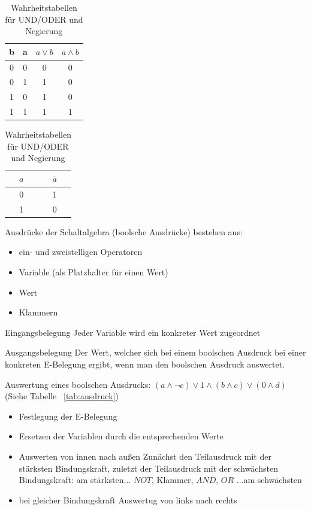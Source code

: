 \documentclass[10pt,a4paper]{scrartcl}
\newcommand{\reftbl}[1]{Tabelle ~\ref{#1}}
\begin{document}
\begin{table}[h]
	\centering
	\begin{minipage}[b]{0.4\textwidth}
		\centering
		\begin{tabular}{cc|c|c}
			b & a & $a \vee b$ & $a \wedge b$\\ \hline
			0 & 0 & 0 & 0\\
			0 & 1 & 1 & 0\\
			1 & 0 & 1 & 0\\
			1 & 1 & 1 & 1\\
		\end{tabular}
	\end{minipage}
	\begin{minipage}[b]{0.4\textwidth}
		\centering
		\begin{tabular}{c|c}
			$a$ & $\overline{a}$\\ \hline
			0 & 1\\
			1 & 0\\
		\end{tabular}
	\end{minipage}	
	\caption{Wahrheitstabellen für UND/ODER und Negierung}
\end{table}

Ausdrücke der Schaltalgebra (\glqq boolsche Ausdrücke\grqq) bestehen aus:
\begin{itemize}
	\item ein- und zweistelligen Operatoren
	\item Variable (als Platzhalter für einen Wert)
	\item Wert
	\item Klammern
\end{itemize}
\begin{Theorem}{Eingangsbelegung}{}
	Jeder Variable wird ein konkreter Wert zugeordnet
\end{Theorem}
\begin{Theorem}{Ausgangsbelegung}{}
	Der Wert, welcher sich bei einem boolschen Ausdruck bei einer konkreten E-Belegung ergibt, wenn man den boolschen Ausdruck \glqq auswertet\grqq.
\end{Theorem}

Auswertung eines boolschen Ausdrucks: $(a \wedge \neg c) \vee 1 \wedge(b \wedge c) \vee (0 \wedge d)$ (Siehe \reftbl{tab:ausdruck})
\begin{itemize}
	\item Festlegung der E-Belegung
	\item Ersetzen der Variablen durch die entsprechenden Werte
	\item Auswerten \glqq von innen nach außen\grqq
	\subitem Zunächst den Teilausdruck mit der stärksten Bindungskraft, zuletzt der Teilausdruck mit der schwächsten\\ Bindungskraft: am stärksten... $NOT$, Klammer, $AND$, $OR$ ...am schwächsten
	\item bei gleicher Bindungskraft Auswertug von links nach rechts
\end{itemize}
\end{document}

